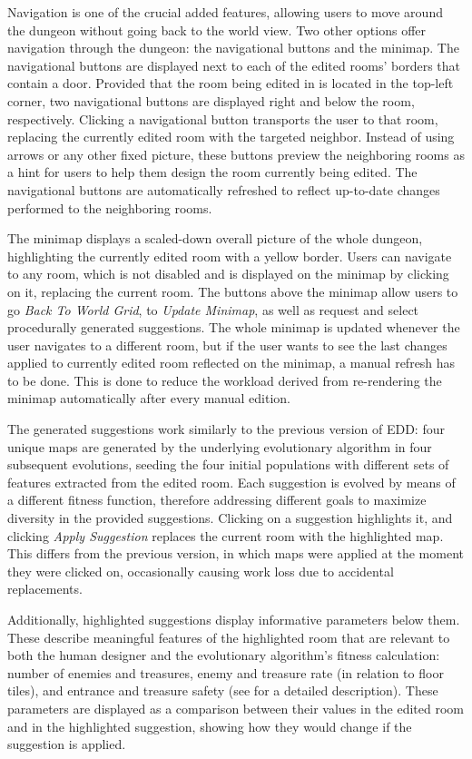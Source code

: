 \documentclass[sigconf]{acmart}
\begin{document}
Navigation is one of the crucial added features, allowing users to move around the dungeon without going back to the world view. Two other options offer navigation through the dungeon: the navigational buttons and the minimap. The navigational buttons are displayed next to each of the edited rooms' borders that contain a door. Provided that the room being edited in  is located in the top-left corner, two navigational buttons are displayed right and below the room, respectively. Clicking a navigational button transports the user to that room, replacing the currently edited room with the targeted neighbor. Instead of using arrows or any other fixed picture, these buttons preview the neighboring rooms as a hint for users to help them design the room currently being edited. The navigational buttons are automatically refreshed to reflect up-to-date changes performed to the neighboring rooms.  

The minimap displays a scaled-down overall picture of the whole dungeon, highlighting the currently edited room with a yellow border. Users can navigate to any room, which is not disabled and is displayed on the minimap by clicking on it, replacing the current room. The buttons above the minimap allow users to go \textit{Back To World Grid}, to \textit{Update Minimap}, as well as request and select procedurally generated suggestions. The whole minimap is updated whenever the user navigates to a different room, but if the user wants to see the last changes applied to currently edited room reflected on the minimap, a manual refresh has to be done. This is done to reduce the workload derived from re-rendering the minimap automatically after every manual edition.

The generated suggestions work similarly to the previous version of EDD: four unique maps are generated by the underlying evolutionary algorithm in four subsequent evolutions, seeding the four initial populations with different sets of features extracted from the edited room. Each suggestion is evolved by means of a different fitness function, therefore addressing different goals to maximize diversity in the provided suggestions. Clicking on a suggestion highlights it, and clicking \textit{Apply Suggestion} replaces the current room with the highlighted map. This differs from the previous version, in which maps were applied at the moment they were clicked on, occasionally causing work loss due to accidental replacements. 

Additionally, highlighted suggestions display informative parameters below them. These describe meaningful features of the highlighted room that are relevant to both the human designer and the evolutionary algorithm's fitness calculation: number of enemies and treasures, enemy and treasure rate (in relation to floor tiles), and entrance and treasure safety (see \cite{Eddy1_5} for a detailed description). These parameters are displayed as a comparison between their values in the edited room and in the highlighted suggestion, showing how they would change if the suggestion is applied. 
\end{document}
